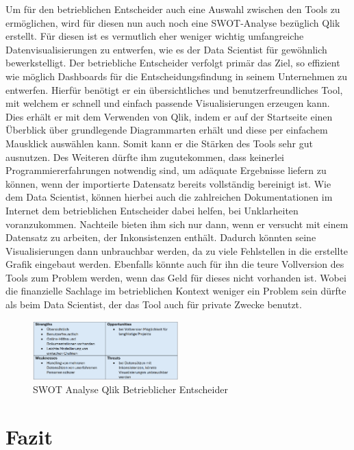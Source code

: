 \documentclass[12pt]{article}
\begin{document}
	Um für den betrieblichen Entscheider auch eine Auswahl zwischen den Tools zu
	ermöglichen, wird für diesen nun auch noch eine SWOT-Analyse bezüglich Qlik erstellt.
	Für diesen ist es vermutlich eher weniger wichtig umfangreiche Datenvisualisierungen
	zu entwerfen, wie es der Data Scientist für gewöhnlich bewerkstelligt. Der betriebliche
	Entscheider verfolgt primär das Ziel, so effizient wie möglich Dashboards für die
	Entscheidungsfindung in seinem Unternehmen zu entwerfen.
	Hierfür benötigt er ein übersichtliches und benutzerfreundliches Tool, mit welchem er
	schnell und einfach passende Visualisierungen erzeugen kann. Dies erhält er mit dem
	Verwenden von Qlik, indem er auf der Startseite einen Überblick über grundlegende
	Diagrammarten erhält und diese per einfachem Mausklick auswählen kann.
	Somit kann er die Stärken des Tools sehr gut ausnutzen.
	Des Weiteren dürfte ihm zugutekommen, dass keinerlei Programmiererfahrungen
	notwendig sind, um adäquate Ergebnisse liefern zu können, wenn der importierte
	Datensatz bereits vollständig bereinigt ist. Wie dem Data Scientist, können hierbei auch
	die zahlreichen Dokumentationen im Internet dem betrieblichen Entscheider dabei
	helfen, bei Unklarheiten voranzukommen.
	Nachteile bieten ihm sich nur dann, wenn er versucht mit einem Datensatz zu arbeiten,
	der Inkonsistenzen enthält. Dadurch könnten seine Visualisierungen dann unbrauchbar
	werden, da zu viele Fehlstellen in die erstellte Grafik eingebaut werden.
	Ebenfalls könnte auch für ihn die teure Vollversion des Tools zum Problem werden, wenn
	das Geld für dieses nicht vorhanden ist. Wobei die finanzielle Sachlage im betrieblichen
	Kontext weniger ein Problem sein dürfte als beim Data Scientist, der das Tool auch für
	private Zwecke benutzt.
	\begin{figure}[h]
		\centering
		\includegraphics[width=0.5\textwidth]{SWOT4}
		\caption{SWOT Analyse Qlik Betrieblicher Entscheider}
	\end{figure}
	
	\section{Fazit}
	
\end{document}
